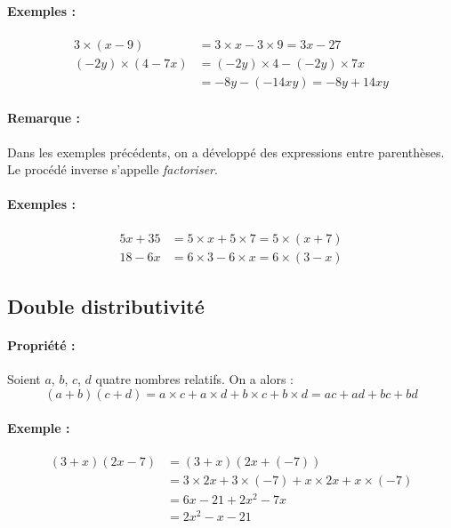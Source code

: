 \documentclass[11pt]{article}
\begin{document}
\paragraph{Exemples :}
\begin{align*}
3 \times (x - 9) &= 3 \times x - 3 \times 9 = 3x - 27 \\
(-2y) \times (4 - 7x) &= (-2y) \times 4 - (-2y) \times 7x \\
&= -8y - (-14xy) = -8y + 14xy
\end{align*}

\paragraph{Remarque :}
Dans les exemples précédents, on a développé des expressions entre parenthèses. Le procédé inverse s'appelle \emph{factoriser}.

\paragraph{Exemples :}
\begin{align*}
5x + 35 &= 5 \times x + 5 \times 7 = 5 \times (x + 7) \\
18 - 6x &= 6 \times 3 - 6 \times x = 6 \times (3 - x)
\end{align*}

\subsection{Double distributivité}
\paragraph{Propriété :}
Soient $a$, $b$, $c$, $d$ quatre nombres relatifs. On a alors :
\[ (a + b)(c + d) = a \times c + a \times d + b \times c + b \times d = ac + ad + bc + bd \]

\paragraph{Exemple :}
\begin{align*}
(3 + x)(2x - 7) &= (3 + x)(2x + (-7)) \\
&= 3 \times 2x + 3 \times (-7) + x \times 2x + x \times (-7) \\
&= 6x - 21 + 2x^2 - 7x \\
&= 2x^2 - x - 21
\end{align*}
\end{document}
